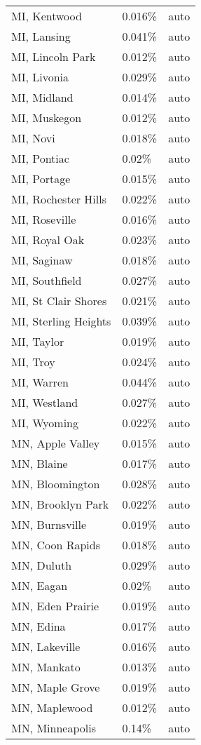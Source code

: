 \begin{longtable}[]{@{}lll@{}}
MI, Kentwood & 0.016\% & auto \\
MI, Lansing & 0.041\% & auto \\
MI, Lincoln Park & 0.012\% & auto \\
MI, Livonia & 0.029\% & auto \\
MI, Midland & 0.014\% & auto \\
MI, Muskegon & 0.012\% & auto \\
MI, Novi & 0.018\% & auto \\
MI, Pontiac & 0.02\% & auto \\
MI, Portage & 0.015\% & auto \\
MI, Rochester Hills & 0.022\% & auto \\
MI, Roseville & 0.016\% & auto \\
MI, Royal Oak & 0.023\% & auto \\
MI, Saginaw & 0.018\% & auto \\
MI, Southfield & 0.027\% & auto \\
MI, St Clair Shores & 0.021\% & auto \\
MI, Sterling Heights & 0.039\% & auto \\
MI, Taylor & 0.019\% & auto \\
MI, Troy & 0.024\% & auto \\
MI, Warren & 0.044\% & auto \\
MI, Westland & 0.027\% & auto \\
MI, Wyoming & 0.022\% & auto \\
MN, Apple Valley & 0.015\% & auto \\
MN, Blaine & 0.017\% & auto \\
MN, Bloomington & 0.028\% & auto \\
MN, Brooklyn Park & 0.022\% & auto \\
MN, Burnsville & 0.019\% & auto \\
MN, Coon Rapids & 0.018\% & auto \\
MN, Duluth & 0.029\% & auto \\
MN, Eagan & 0.02\% & auto \\
MN, Eden Prairie & 0.019\% & auto \\
MN, Edina & 0.017\% & auto \\
MN, Lakeville & 0.016\% & auto \\
MN, Mankato & 0.013\% & auto \\
MN, Maple Grove & 0.019\% & auto \\
MN, Maplewood & 0.012\% & auto \\
MN, Minneapolis & 0.14\% & auto \\

\end{longtable}
